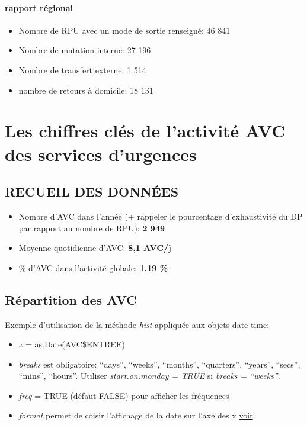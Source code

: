 \documentclass[]{article}
\begin{document}
\paragraph{rapport régional}\label{rapport-regional}

\begin{itemize}
\itemsep1pt\parskip0pt
\item
  Nombre de RPU avec un mode de sortie renseigné: 46 841
\item
  Nombre de mutation interne: 27 196
\item
  Nombre de transfert externe: 1 514
\item
  nombre de retours à domicile: 18 131
\end{itemize}

\section{Les chiffres clés de l'activité AVC des services
d'urgences}\label{les-chiffres-cles-de-lactivite-avc-des-services-durgences}

\subsection{RECUEIL DES DONNÉES}\label{recueil-des-donnees-2}

\begin{itemize}
\itemsep1pt\parskip0pt
\item
  Nombre d'AVC dans l'année (+ rappeler le pourcentage d'exhaustivité du
  DP par rapport au nombre de RPU): \textbf{2 949}
\item
  Moyenne quotidienne d'AVC: \textbf{8,1 AVC/j}
\item
  \% d'AVC dans l'activité globale: \textbf{1.19 \%}
\end{itemize}

\subsection{Répartition des AVC}\label{repartition-des-avc}

Exemple d'utilisation de la méthode \emph{hist} appliquée aux objets
date-time:

\begin{itemize}
\itemsep1pt\parskip0pt
\item
  \emph{x} = as.Date(AVC\$ENTREE)
\item
  \emph{breaks} est obligatoire: ``days'', ``weeks'', ``months'',
  ``quarters'', ``years'', ``secs'', ``mins'', ``hours''. Utiliser
  \emph{start.on.monday = TRUE} si \emph{breaks = ``weeks''}.
\item
  \emph{freq} = TRUE (défaut FALSE) pour afficher les fréquences
\item
  \emph{format} permet de coisir l'affichage de la date sur l'axe des x
  \href{https://stat.ethz.ch/R-manual/R-devel/library/base/html/strptime.html}{voir}.
\end{itemize}
\end{document}
